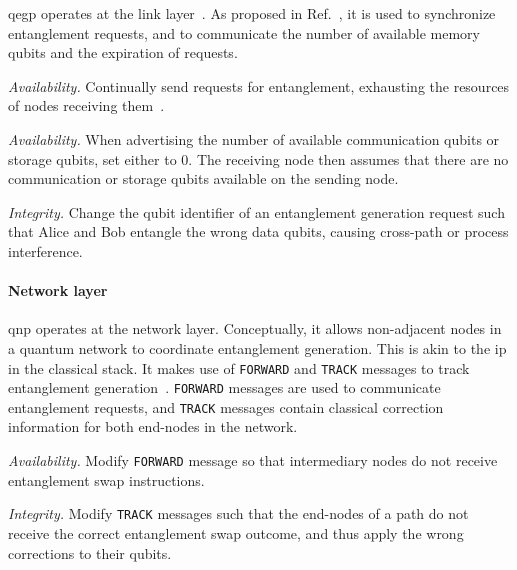 \acrshort{qegp} operates at the link layer~\cite{dahlberg_2019_egp}. As proposed in
Ref.~\cite{dahlberg_2019_egp}, it is used to synchronize entanglement requests, and to communicate
the number of available memory qubits and the expiration of requests.

\begin{example}
\textit{Availability.}
Continually send requests for entanglement, exhausting the resources of nodes receiving
them~\cite{kozlowski_2019_towards}.
\end{example}

\begin{example}
\textit{Availability.}
When advertising the number of available communication qubits or storage qubits, set either to 0.
The receiving node then assumes that there are no communication or storage qubits available on the
sending node.
\end{example}

\begin{example}
\textit{Integrity.}
Change the qubit identifier of an entanglement generation request such that Alice and Bob entangle
the wrong data qubits, causing cross-path or process interference.
\end{example}

\paragraph{Network layer}

\acrshort{qnp} operates at the network layer. Conceptually, it allows non-adjacent nodes in a
quantum network to coordinate entanglement generation. This is akin to the \acrfull{ip} in the
classical stack. It makes use of \texttt{FORWARD} and \texttt{TRACK} messages to track entanglement
generation~\cite[Figure 6]{kozlowski_2020_qnp}. \texttt{FORWARD} messages are used to communicate
entanglement requests, and \texttt{TRACK} messages contain classical correction information for both
end-nodes in the network.

\begin{example}
\textit{Availability.}
Modify \texttt{FORWARD} message so that intermediary nodes do not receive entanglement swap
instructions.
\end{example}

\begin{example}
\textit{Integrity.}
Modify \texttt{TRACK} messages such that the end-nodes of a path do not receive the correct
entanglement swap outcome, and thus apply the wrong corrections to their qubits.
\end{example}

